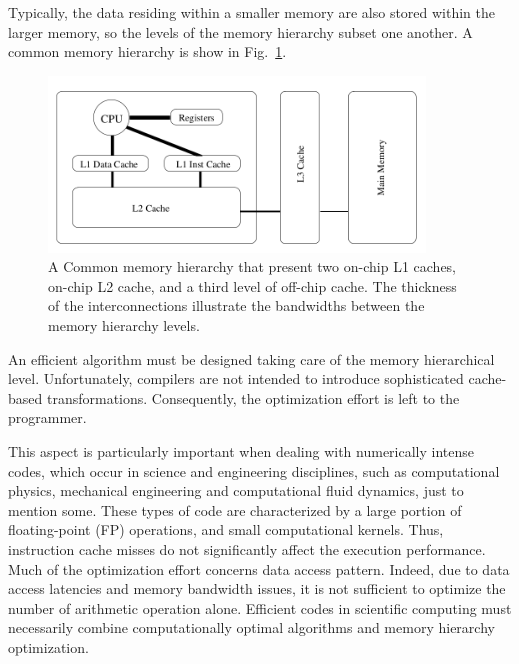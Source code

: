 Typically, the data residing within a smaller memory are also stored within the larger memory, so the levels of the memory hierarchy subset one another. A common memory hierarchy is show in Fig.~\ref{fig:memory-hierarchy}.
\begin{figure}
   \centering
   \includegraphics[width=10cm]{Figs/Memory_hierarchy.png}
   \caption{A Common memory hierarchy that present two on-chip L1 caches, on-chip L2 cache, and a third level of off-chip cache. The thickness of the interconnections illustrate the bandwidths between the memory hierarchy levels.} \label{fig:memory-hierarchy}
\end{figure} 

An efficient algorithm must be designed taking care of the memory hierarchical level. Unfortunately, compilers are not intended to introduce sophisticated cache-based transformations. Consequently, the optimization effort is left to the programmer. 

This aspect is particularly important when dealing with numerically intense codes, which occur in science and engineering disciplines, such as computational physics, mechanical engineering and computational fluid dynamics, just to mention some. These types of code are characterized by a large portion of floating-point (FP) operations, and small computational kernels. Thus, instruction cache misses do not significantly affect the execution performance. Much of the optimization effort concerns data access pattern. Indeed, due to data access latencies and memory bandwidth issues, it is not sufficient to optimize the number of arithmetic operation alone. Efficient codes in scientific computing must necessarily combine computationally optimal algorithms and memory hierarchy optimization.

